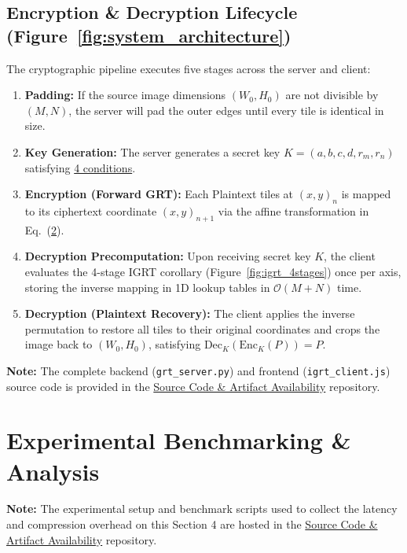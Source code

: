 \documentclass{article}
\begin{document}
\subsection{Encryption \& Decryption Lifecycle (Figure~\ref{fig:system_architecture})}
The  cryptographic pipeline executes five stages across the server and client:
\begin{enumerate}\setlength{\itemsep}{1pt}\setlength{\parskip}{0pt}
    \item \textbf{Padding:} If the source image dimensions $(W_0, H_0)$ are not divisible by $(M, N)$, the server will pad the outer edges until every tile is identical in size.
    \item \textbf{Key Generation:} The server generates a secret key $K = (a, b, c, d, r_m, r_n)$ satisfying \hyperref[4_conditions]{4 conditions}.
    \item \textbf{Encryption (Forward GRT):} Each Plaintext tiles at $(x, y)_n$ is mapped to its ciphertext coordinate $(x, y)_{n+1}$ via the affine transformation in Eq.~(\hyperref[eq:grt]{2}).
    \item \textbf{Decryption Precomputation:} Upon receiving secret key $K$, the client evaluates the 4-stage IGRT corollary (Figure~\ref{fig:igrt_4stages}) once per axis, storing the inverse mapping in 1D lookup tables in $\mathcal{O}(M+N)$ time.
    \item \textbf{Decryption (Plaintext Recovery):} The client applies the inverse permutation to restore all tiles to their original coordinates and crops the image back to $(W_0, H_0)$, satisfying $\mathrm{Dec}_K(\mathrm{Enc}_K(P)) = P$.
\end{enumerate}

\medskip
\noindent\footnotesize\textbf{Note:} The complete backend (\texttt{grt\_server.py}) and frontend (\texttt{igrt\_client.js}) source code is provided in the \hyperref[artifact_box]{Source Code \& Artifact Availability} repository.\normalsize

\section{Experimental Benchmarking \& Analysis}
\label{sec:benchmark_analysis}

\smallskip
\noindent\footnotesize\textbf{Note:} The experimental setup and benchmark scripts used to collect the latency and compression overhead on this Section 4 are hosted in the \hyperref[artifact_box]{Source Code \& Artifact Availability} repository.\normalsize
\end{document}

